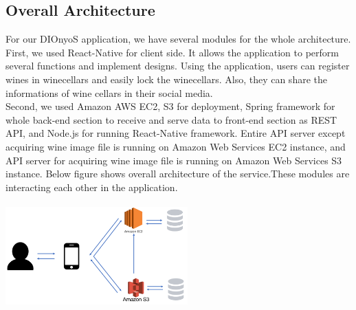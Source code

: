 \documentclass[conference]{IEEEtran}
\numberwithin{figure}{subsection}
\begin{document}
\subsection{Overall Architecture}
\indent For our DIOnyoS application, we have several modules for the whole architecture.
First, we used React-Native for client side. It allows the application to perform several functions and implement designs. Using the application, users can register wines in winecellars and easily lock the winecellars. Also, they can share the informations of wine cellars in their social media.\\
\indent Second, we used Amazon AWS EC2, S3 for deployment, Spring framework for whole back-end section to receive and serve data to front-end section as REST API, and Node.js for running React-Native framework. Entire API server except acquiring wine image file is running on Amazon Web Services EC2 instance, and API server for acquiring wine image file is running on Amazon Web Services S3 instance. Below figure shows overall architecture of the service.These modules are interacting each other in the application. 

\centerline{\includegraphics[width=7cm, height=4cm]{overallarch.png}}
\end{document}
